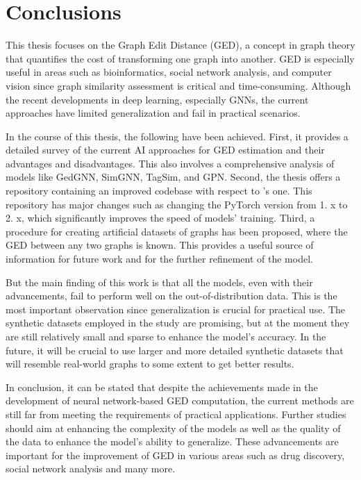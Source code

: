 \documentclass[../Thesis.tex]{subfiles}
\begin{document}
	\chapter{Conclusions}
	\label{sec:discussion_and_conclusions}
	This thesis focuses on the Graph Edit Distance (GED), a concept in graph theory that quantifies the cost of transforming one graph into another. GED is especially useful in areas such as bioinformatics, social network analysis, and computer vision since graph similarity assessment is critical and time-consuming. Although the recent developments in deep learning, especially GNNs, the current approaches have limited generalization and fail in practical scenarios.
	
	In the course of this thesis, the following have been achieved. First, it provides a detailed survey of the current AI approaches for GED estimation and their advantages and disadvantages. This also involves a comprehensive analysis of models like GedGNN, SimGNN, TagSim, and GPN. Second, the thesis offers a repository containing an improved codebase with respect to  \cite{computing_graph_edit_distance_via_neural_graph_matching}'s one. This repository has major changes such as changing the PyTorch version from 1. x to 2. x, which significantly improves the speed of models' training. Third, a procedure for creating artificial datasets of graphs has been proposed, where the GED between any two graphs is known. This provides a useful source of information for future work and for the further refinement of the model.
	
	But the main finding of this work is that all the models, even with their advancements, fail to perform well on the out-of-distribution data. This is the most important observation since generalization is crucial for practical use. The synthetic datasets employed in the study are promising, but at the moment they are still relatively small and sparse to enhance the model’s accuracy. In the future, it will be crucial to use larger and more detailed synthetic datasets that will resemble real-world graphs to some extent to get better results.
	
	In conclusion, it can be stated that despite the achievements made in the development of neural network-based GED computation, the current methods are still far from meeting the requirements of practical applications. Further studies should aim at enhancing the complexity of the models as well as the quality of the data to enhance the model’s ability to generalize. These advancements are important for the improvement of GED in various areas such as drug discovery, social network analysis and many more.
\end{document}
